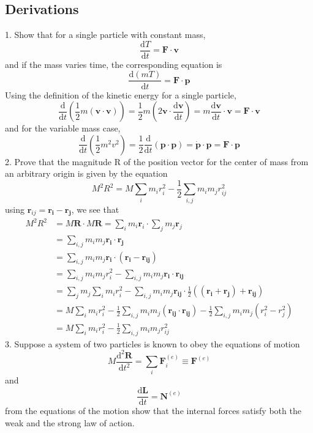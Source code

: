 \documentclass[]{article}
\numberwithin{equation}{section}
\begin{document}
\subsection{Derivations}
1. Show that for a single particle with constant mass,
$$\frac{\mathrm dT}{\mathrm dt}=\mathbf F\cdot\mathbf v$$
and if the mass varies time, the corresponding equation is
$$\frac{\mathrm d(mT)}{\mathrm dt}=\mathbf F\cdot\mathbf p$$
Using the definition of the kinetic energy for a single particle,
$$\frac{\mathrm d}{\mathrm dt}\left(\frac 12m(\mathbf{v\cdot v})\right)=\frac 12m\left(2\mathbf v\cdot\frac{\mathrm d\mathbf v}{\mathrm dt}\right)=m\frac{\mathrm d\mathbf v}{\mathrm dt}\cdot\mathbf v=\mathbf{F\cdot v}$$
and for the variable mass case,
$$\frac{\mathrm d}{\mathrm dt}\left(\frac 12m^2v^2\right)=\frac 12\frac{\mathrm d}{\mathrm dt}(\mathbf{p\cdot p})=\mathbf{\dot p\cdot p}=\mathbf F\cdot\mathbf p$$
2. Prove that the magnitude R of the position vector for the center of mass from an arbitrary origin is given by the equation 
$$M^2R^2=M\sum_im_ir_i^2-\frac 12\sum_{i,j}m_im_jr_{ij}^2$$
using $\mathbf r_{ij}=\mathbf{r_i-r_j}$, we see that
\begin{align*}
	M^2R^2&=M\mathbf R\cdot M\mathbf R=\sum_im_i\mathbf r_i\cdot\sum_jm_j\mathbf r_j\\
	&=\sum_{i,j}m_im_j\mathbf{r_i\cdot r_j}\\
	&=\sum_{i,j}m_im_j\mathbf{r_i\cdot(r_i-r_{ij})}\\
	&=\sum_{i,j}m_im_jr_i^2-\sum_{i,j}m_im_j\mathbf{r_i\cdot r_{ij}}\\
	&=\sum_jm_j\sum_im_ir_i^2-\sum_{i,j}m_im_j\mathbf{r_{ij}}\cdot\frac 12\mathbf{((r_i+r_j)+r_{ij})}\\
	&=M\sum_im_ir_i^2-\frac 12\sum_{i,j}m_im_j\mathbf{(r_{ij}\cdot r_{ij})}-\frac 12\sum_{i,j}m_im_j(r_i^2-r_j^2)\\
	&=M\sum_im_ir_i^2-\frac 12\sum_{i,j}m_im_jr_{ij}^2
\end{align*}
3. Suppose a system of two particles is known to obey the equations of motion
$$M\frac{\mathrm d^2\mathbf R}{\mathrm dt^2}=\sum_i\mathbf F_i^{(e)}\equiv\mathbf F^{(e)}$$
and
$$\frac{\mathrm d\mathbf L}{\mathrm dt}=\mathbf N^{(e)}$$
from the equations of the motion show that the internal forces satisfy both the weak and the strong law of action. 
\end{document}
